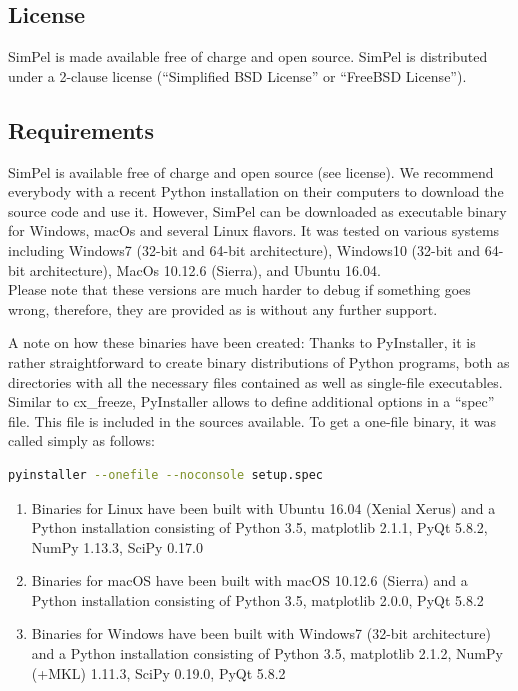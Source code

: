 \documentclass[pdftex,bezier,german,a4,twoside, headexclude,12pt,nochapterprefix, titlepage]{extarticle}
\newcommand{\simpel}{\textsf{SimPel} }
\begin{document}
\subsection{License}
\simpel is made available free of charge and open source. 
\simpel is distributed under a 2-clause license (“Simplified BSD License” or “FreeBSD License”).

\subsection{Requirements}
\simpel is available free of charge and open source (see license). We recommend everybody with a recent Python installation on their computers to download the source code and use it. 
However, 
\simpel can be downloaded as executable binary for Windows, macOs and several Linux flavors.
It was tested on various systems including Windows7 (32-bit and 64-bit architecture), Windows10 (32-bit and 64-bit architecture), MacOs 10.12.6 (Sierra),
and Ubuntu 16.04.\\

Please note that these versions are much harder to debug if something goes wrong, therefore, they are provided as is without any further support. 



A note on how these binaries have been created: Thanks to PyInstaller, it is rather straightforward to create binary distributions
of Python programs, both as directories with all the necessary files contained as well as single-file executables. 
Similar to cx\_freeze, PyInstaller allows to define additional options in a “spec” file. 
This file is included in the sources available. To get a one-file binary, it was called simply as follows:\\
\begin{lstlisting}[language=bash]
  pyinstaller --onefile --noconsole setup.spec
\end{lstlisting}
\begin{enumerate}
\item Binaries for Linux have been built with Ubuntu 16.04 (Xenial Xerus) and a Python installation consisting of Python 3.5, matplotlib 2.1.1, PyQt 5.8.2,  NumPy 1.13.3, SciPy 0.17.0
\item  Binaries for macOS have been built with macOS 10.12.6 (Sierra) and a Python installation consisting of Python 3.5, matplotlib 2.0.0, PyQt 5.8.2
 \item  Binaries for Windows have been built with Windows7 (32-bit architecture) and a Python installation consisting of Python 3.5, matplotlib 2.1.2, NumPy (+MKL) 1.11.3, SciPy 0.19.0, PyQt 5.8.2
\end{enumerate}
\end{document}
